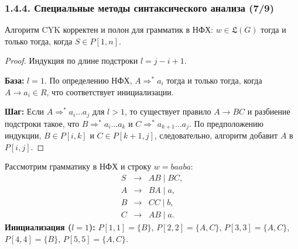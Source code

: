 \begin{frame}
\frametitle{1.4.4. Специальные методы синтаксического анализа (7/9)}

\begin{theorem}
    Алгоритм CYK корректен и полон для грамматик в НФХ:
    $w \in \mathfrak{L}(G)$ тогда и только тогда, когда $S \in P[1,n]$.
\end{theorem}

\begin{proof}
Индукция по длине подстроки $l = j-i+1$.

\textbf{База:} $l=1$. По определению НФХ, $A \Rightarrow^* a_i$ тогда и только тогда, когда $A \to a_i \in R$, что соответствует инициализации.

\textbf{Шаг:} Если $A \Rightarrow^* a_i \dots a_j$ для $l>1$, то существует правило $A \to BC$ и разбиение подстроки такое, что $B \Rightarrow^* a_i \dots a_k$ и $C \Rightarrow^* a_{k+1} \dots a_j$. По предположению индукции, $B \in P[i,k]$ и $C \in P[k+1,j]$, следовательно, алгоритм добавит $A$ в $P[i,j]$.
\end{proof}

\begin{example}
    Рассмотрим грамматику в НФХ и строку $w = baaba$:
    \[
    \begin{array}{rcl}
    S & \to & AB \mid BC,\\
    A & \to & BA \mid a,\\
    B & \to & CC \mid b,\\
    C & \to & AB \mid a.
    \end{array}
    \]
    \textbf{Инициализация ($l=1$):}
    $P[1,1]=\{B\}$, $P[2,2]=\{A,C\}$, $P[3,3]=\{A,C\}$, $P[4,4]=\{B\}$, $P[5,5]=\{A,C\}$.
\end{example}
\end{frame}

